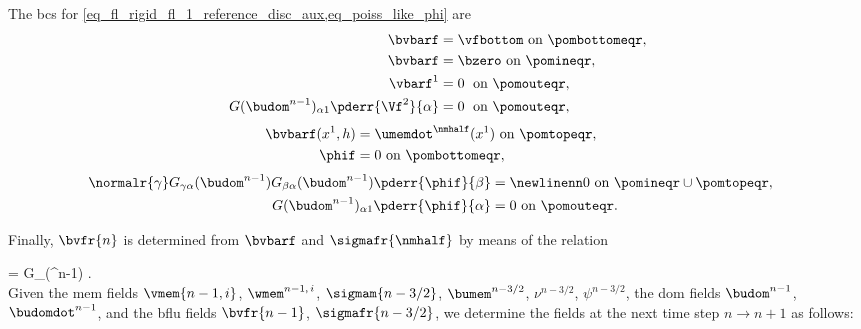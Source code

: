 The \acp{bc} for \cref{eq_fl_rigid_fl_1_reference_disc_aux,eq_poiss_like_phi} are \cite{loggAutomatedSolutionDifferential2012}
\begin{align}
        \label{bc_fl_membrane_1_current_disc}
        \bvbarf                                         & =  \vfbottom  \text{ on } \pombottomeqr, \\
        \label{bc_fl_membrane_2_current_disc}
        \bvbarf                                         & =  \bzero  \text{ on } \pomineqr,        \\
        \label{bc_fl_membrane_3_current_disc}
        \vbarf^1                                        & =  0 \; \text{ on } \pomouteqr ,         \\
        \label{bc_fl_membrane_4_current_disc}
        G(\budom^{n-1})_{\alpha 1}\pderr{\Vf^2}{\alpha} & =  0 \; \text{ on } \pomouteqr ,
\end{align}
\begin{align}
        \label{bc_fl_membrane_5_current_disc}
        \bvbarf(x^1, h) & = \umemdot^\nmhalf(x^1)  \text{ on } \pomtopeqr, & \\
        \label{bc_fl_membrane_6_current_disc}
        \phif           & = 0 \text{ on } \pombottomeqr,
\end{align}
\begin{align}
        \label{bc_fl_membrane_7_current_disc}
        \normalr{\gamma}  G_{\gamma \alpha}(\budom^{n-1})  G_{\beta \alpha}(\budom^{n-1})
        \pderr{ \phif   }{\beta }                        & = \newlinenn
        0
        \text{ on } \pomineqr \cup \pomtopeqr ,          &                             \\
        \label{bc_fl_membrane_8_current_disc}
        G(\budom^{n-1})_{\alpha 1} \pderr{\phif}{\alpha} & = 0 \text{ on } \pomouteqr.
\end{align}


Finally, $\bvfr{n}$ is determined from $\bvbarf $ and $\sigmafr{\nmhalf}$ by means of the relation

\be
\label{eq_phi_1}
\rhof {}  = G_{\beta \alpha}(\budom^{n-1})         \pderr{ \phif   }{\beta }  \omr.
\ee\vspace{1cm}\\





Given the \ac{mem} fields $\vmem{n-1, i}$, $\wmem^{n-1, \, i}$, $\sigmam{n-3/2}$, $\bumem^{n-3/2}$, $\nu^{n-3/2}$, $\psi^{n-3/2}$, the \ac{dom} fields $\budom^{n-1}$, $\budomdot^{n-1}$, and the \ac{bflu} fields $\bvfr{n-1}$, $\sigmafr{n-3/2}$, we determine the fields at the next time step $n \rightarrow n+1$ as follows:


